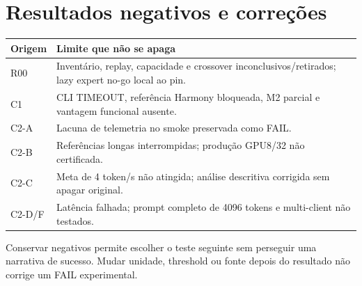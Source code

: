 \clearpage
\section{Resultados negativos e correções}
\begin{tabularx}{\linewidth}{@{}p{28mm}Y@{}}
\toprule \textbf{Origem} & \textbf{Limite que não se apaga}\\ \midrule
R00 & Inventário, replay, capacidade e crossover inconclusivos/retirados; lazy expert no-go local ao pin.\\
C1 & CLI TIMEOUT, referência Harmony bloqueada, M2 parcial e vantagem funcional ausente.\\
C2-A & Lacuna de telemetria no smoke preservada como FAIL.\\
C2-B & Referências longas interrompidas; produção GPU8/32 não certificada.\\
C2-C & Meta de 4 token/s não atingida; análise descritiva corrigida sem apagar original.\\
C2-D/F & Latência falhada; prompt completo de 4096 tokens e multi-client não testados.\\
\bottomrule
\end{tabularx}
  

Conservar negativos permite escolher o teste seguinte sem perseguir uma narrativa de sucesso. Mudar unidade, threshold ou fonte depois do resultado não corrige um FAIL experimental.
